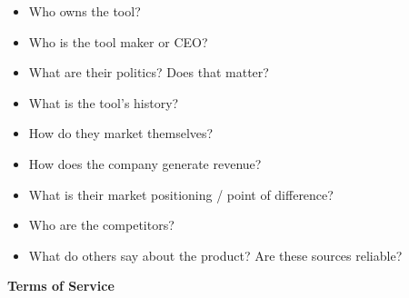\documentclass[
]{book}
\providecommand{\tightlist}{%
  \setlength{\itemsep}{0pt}\setlength{\parskip}{0pt}}
\theoremstyle{definition}
\theoremstyle{definition}
\theoremstyle{definition}
\theoremstyle{definition}
\theoremstyle{remark}
\begin{document}
\begin{reflect}
\begin{itemize}
\tightlist
\item
  Who owns the tool?\\
\item
  Who is the tool maker or CEO?\\
\item
  What are their politics? Does that matter?\\
\item
  What is the tool's history?\\
\item
  How do they market themselves?\\
\item
  How does the company generate revenue?\\
\item
  What is their market positioning / point of difference?\\
\item
  Who are the competitors?\\
\item
  What do others say about the product? Are these sources reliable?
\end{itemize}

\textbf{Terms of Service}


\end{reflect}
\end{document}
